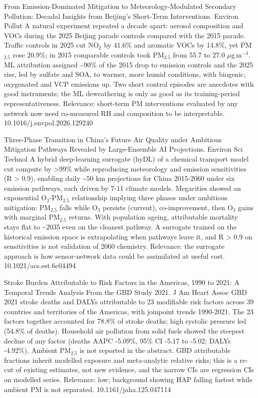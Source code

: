 \documentclass[10pt]{article}
\begin{document}
{From Emission-Dominated Mitigation to Meteorology-Modulated Secondary Pollution: Decadal Insights from Beijing's Short-Term Interventions.}
{Environ Pollut}
{A natural experiment repeated a decade apart: aerosol composition and VOCs during the 2025 Beijing parade controls compared with the 2015 parade. Traffic controls in 2025 cut NO$_2$ by 41.6\% and aromatic VOCs by 14.8\%, yet PM$_{2.5}$ rose 20.9\%; in 2015 comparable controls took PM$_{2.5}$ from 55.7 to 27.0 $\mu$g\,m$^{-3}$. ML attribution assigned \textasciitilde{}90\% of the 2015 drop to emission controls and the 2025 rise, led by sulfate and SOA, to warmer, more humid conditions, with biogenic, oxygenated and VCP emissions up. Two short control episodes are anecdotes with good instruments; the ML deweathering is only as good as its training-period representativeness. Relevance: short-term PM interventions evaluated by any network now need co-measured RH and composition to be interpretable.}
{10.1016/j.envpol.2026.129240}

{Three-Phase Transition in China's Future Air Quality under Ambitious Mitigation Pathways Revealed by Large-Ensemble AI Projections.}
{Environ Sci Technol}
{A hybrid deep-learning surrogate (hyDL) of a chemical transport model cut compute by >99\% while reproducing meteorology and emission sensitivities (R > 0.9), enabling daily \textasciitilde{}50 km projections for China 2015-2060 under six emission pathways, each driven by 7-11 climate models. Megacities showed an exponential O$_3$-PM$_{2.5}$ relationship implying three phases under ambitious mitigation: PM$_{2.5}$ falls while O$_3$ persists (current), co-improvement, then O$_3$ gains with marginal PM$_{2.5}$ returns. With population ageing, attributable mortality stays flat to \textasciitilde{}2035 even on the cleanest pathway. A surrogate trained on the historical emission space is extrapolating when pathways leave it, and R > 0.9 on sensitivities is not validation of 2060 chemistry. Relevance: the surrogate approach is how sensor-network data could be assimilated at useful cost.}
{10.1021/acs.est.6c04494}

{Stroke Burden Attributable to Risk Factors in the Americas, 1990 to 2021: A Temporal Trends Analysis From the GBD Study 2021.}
{J Am Heart Assoc}
{GBD 2021 stroke deaths and DALYs attributable to 23 modifiable risk factors across 39 countries and territories of the Americas, with joinpoint trends 1990-2021. The 23 factors together accounted for 78.8\% of stroke deaths; high systolic pressure led (54.8\% of deaths). Household air pollution from solid fuels showed the steepest decline of any factor (deaths AAPC -5.09\%, 95\% CI -5.17 to -5.02; DALYs -4.92\%). Ambient PM$_{2.5}$ is not reported in the abstract. GBD attributable fractions inherit modelled exposure and meta-analytic relative risks; this is a re-cut of existing estimates, not new evidence, and the narrow CIs are regression CIs on modelled series. Relevance: low; background showing HAP falling fastest while ambient PM is not separated.}
{10.1161/jaha.125.047114}
\end{document}
